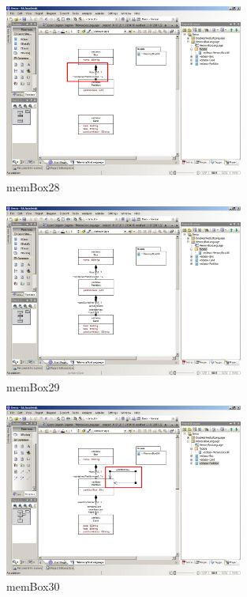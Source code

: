 \begin{figure}[htbp]
	\centering
  \includegraphics[width=0.7\textwidth]{pics/memBox28.png}
	\caption{memBox28}
	\label{memBox28}
\end{figure}

\begin{figure}[htbp]
	\centering
  \includegraphics[width=0.7\textwidth]{pics/memBox29.png}
	\caption{memBox29}
	\label{memBox29}
\end{figure}

\begin{figure}[htbp]
	\centering
  \includegraphics[width=0.7\textwidth]{pics/memBox30.png}
	\caption{memBox30}
	\label{memBox30}
\end{figure}

